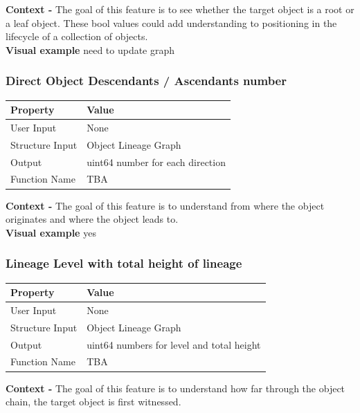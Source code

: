 \documentclass{article}
\begin{document}
\textbf{Context -} The goal of this feature is to see whether the target object is a root or a leaf object. These bool values could add understanding to positioning in the lifecycle of a collection of objects.
\\

\textbf{Visual example}
need to update graph

\subsubsection{Direct Object Descendants / Ascendants number}
\begin{center}
	\begin{tabular}{| p{3cm} p{7cm} |}
		\hline
		\textbf{Property} & \textbf{Value}\\
		\hline
		User Input & None\\
		Structure Input & Object Lineage Graph\\
		Output & uint64 number for each direction\\
		Function Name & TBA\\
		\hline
	\end{tabular}
\end{center}

\textbf{Context -} The goal of this feature is to understand from where the object originates and where the object leads to.
\\

\textbf{Visual example}
yes

\subsubsection{Lineage Level with total height of lineage}
\begin{center}
	\begin{tabular}{| p{3cm} p{7cm} |}
		\hline
		\textbf{Property} & \textbf{Value}\\
		\hline
		User Input & None\\
		Structure Input & Object Lineage Graph\\
		Output & uint64 numbers for level and total height\\
		Function Name & TBA\\
		\hline
	\end{tabular}
\end{center}

\textbf{Context -} The goal of this feature is to understand how far through the object chain, the target object is first witnessed.
\\
\end{document}

